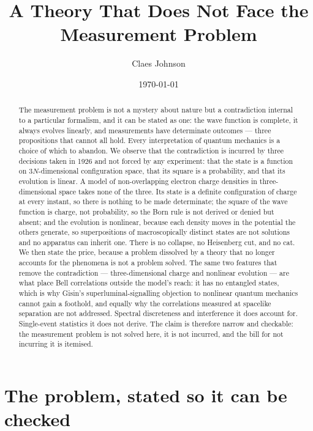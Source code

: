 \documentclass[11pt]{article}
\title{A Theory That Does Not Face the Measurement Problem}
\author[1]{Claes Johnson}
\affil[1]{KTH Royal Institute of Technology, SE-100 44 Stockholm, Sweden \\
\small\texttt{claesjohnson@gmail.com}}
\date{\today}
\begin{document}
\maketitle

\begin{abstract}
The measurement problem is not a mystery about nature but a contradiction internal to a particular
formalism, and it can be stated as one: the wave function is complete, it always evolves linearly,
and measurements have determinate outcomes --- three propositions that cannot all hold. Every
interpretation of quantum mechanics is a choice of which to abandon. We observe that the
contradiction is incurred by three decisions taken in 1926 and not forced by any experiment: that
the state is a function on $3N$-dimensional configuration space, that its square is a probability,
and that its evolution is linear. A model of non-overlapping electron charge densities in
three-dimensional space takes none of the three. Its state is a definite configuration of charge at
every instant, so there is nothing to be made determinate; the square of the wave function is
charge, not probability, so the Born rule is not derived or denied but absent; and the evolution is
nonlinear, because each density moves in the potential the others generate, so superpositions of
macroscopically distinct states are not solutions and no apparatus can inherit one. There is no
collapse, no Heisenberg cut, and no cat. We then state the price, because a problem dissolved by a
theory that no longer accounts for the phenomena is not a problem solved. The same two features
that remove the contradiction --- three-dimensional charge and nonlinear evolution --- are what
place Bell correlations outside the model's reach: it has no entangled states, which is why Gisin's
superluminal-signalling objection to nonlinear quantum mechanics cannot gain a foothold, and
equally why the correlations measured at spacelike separation are not addressed. Spectral
discreteness and interference it does account for. Single-event statistics it does not derive. The
claim is therefore narrow and checkable: the measurement problem is not solved here, it is not
incurred, and the bill for not incurring it is itemised.
\end{abstract}

\section{The problem, stated so it can be checked}\label{sec:problem}
\end{document}
